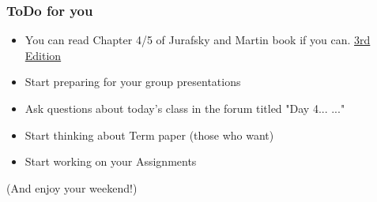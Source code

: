 \documentclass{beamer}
\begin{document}
\begin{frame}
\frametitle{ToDo for you}
\begin{itemize}
    \item You can read Chapter 4/5 of Jurafsky and Martin book if you can. \href{https://web.stanford.edu/~jurafsky/slp3/}{3rd Edition}
    \item Start preparing for your group presentations
    \item Ask questions about today's class in the forum titled "Day 4... ..."
    \item Start thinking about Term paper (those who want)
    \item Start working on your Assignments
\end{itemize}
(And enjoy your weekend!)
\end{frame}

\end{document}
